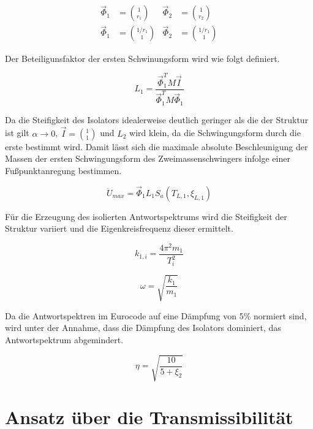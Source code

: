 \begin{align}
\vec{\Phi}_1 &= \binom{1}{r_1} & \vec{\Phi}_2 &= \binom{1}{r_2}\\
\vec{\Phi}_1 &= \binom{1/r_1}{1} & \vec{\Phi}_2 &= \binom{1/r_1}{1}
\end{align}

Der Beteiligunsfaktor der ersten Schwinungsform wird wie folgt definiert.

\begin{equation}
L_1 = \frac{\vec{\Phi}_1^T M \vec{I}}{\vec{\Phi}_1^T M \vec{\Phi}_1}
\end{equation}

Da die Steifigkeit des Isolators idealerweise deutlich geringer als die der Struktur ist gilt $\alpha \rightarrow 0$, $\vec{I} = \binom{1}{1}$ und $L_2$ wird klein, da die Schwingungsform durch die erste bestimmt wird.
Damit lässt sich die maximale absolute Beschleunigung der Massen der ersten Schwingungsform des Zweimassenschwingers infolge einer Fußpunktanregung bestimmen.

\begin{equation}
\ddot U_{max} = \vec{\Phi}_1 L_1 S_a(T_{L,1}, \xi_{L,1})
\end{equation}

Für die Erzeugung des isolierten Antwortspektrums wird die Steifigkeit der Struktur variiert und die Eigenkreisfrequenz dieser ermittelt.

\begin{equation}
k_{1,i} = \frac{4 \pi^2 m_1}{T_i^2}
\end{equation}

\begin{equation}
\omega = \sqrt{\frac{k_1}{m_1}}
\end{equation}

Da die Antwortspektren im Eurocode auf eine Dämpfung von 5\% normiert sind, wird unter der Annahme, dass die Dämpfung des Isolators dominiert, das Antwortspektrum abgemindert.

\begin{equation}\label{eta}
\eta = \sqrt{\frac{10}{5 + \xi_2}}
\end{equation}

\section{Ansatz über die Transmissibilität}
\label{sec:ansatztrasnm}

